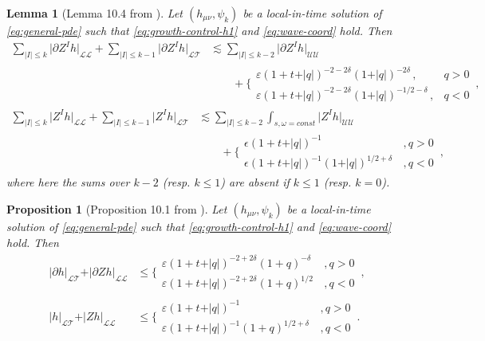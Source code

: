 \documentclass[11pt, a4paper]{amsart}
\numberwithin{equation}{section}
\newtheorem{lemma}[theorem]{Lemma}
\newtheorem{proposition}[theorem]{Proposition}
\numberwithin{theorem}{section}
\newcommand{\p}{\partial}
\newcommand{\mn}{{\mu \nu}}
\newcommand{\UU}{{\mathcal{U} \mathcal{U}}}
\newcommand{\LL}{{\mathcal{L} \mathcal{L}}}
\newcommand{\LT}{{\mathcal{L} \mathcal{T}}}
\newcommand{\qv}{\vert q \vert}
\newcommand{\I}{\vert I \vert}
\begin{document}
 \begin{lemma}[Lemma 10.4 from \cite{LR:04}] \label{lemma-10.4}
Let $(h_\mn, \psi_k)$ be a local-in-time solution of \eqref{eq:general-pde} such that \eqref{eq:growth-control-h1} and \eqref{eq:wave-coord} hold. Then
\begin{align*}
\sum_{\I \leq k} \vert \p Z^I h \vert_\LL + \sum_{\I \leq k-1} \vert \p Z^I h \vert_\LT & \lesssim \sum_{\I \leq k-2} \vert \p Z^I h \vert_\UU \\ & \qquad + \Bigg\lbrace \begin{array}{ll}
\varepsilon (1+t+\qv)^{-2-2 \delta} (1+\qv)^{-2 \delta} \,, & q>0 \\
\varepsilon (1+t+\qv)^{-2-2 \delta} (1+\qv)^{-1/2-\delta} \,, & q<0 
\end{array} \,,
\end{align*}
\begin{align*}
\sum_{\I \leq k} \vert Z^I h \vert_\LL + \sum_{\I \leq k-1} \vert Z^I h \vert_\LT & \lesssim \sum_{\I \leq k-2} \int_{s,\omega = const} \vert Z^I h \vert_\UU \\ & \qquad + \Bigg\lbrace \begin{array}{ll}
\epsilon (1+t+\qv)^{-1} & \,, q>0 \\
\epsilon (1+t+\qv)^{-1} (1+\qv)^{1/2+\delta} & \,, q<0 
\end{array}\,,
\end{align*}
where here the sums over $k-2$ (resp. $k\leq 1$) are absent if $k \leq 1$ (resp. $k=0$).
\end{lemma}

\begin{proposition}[Proposition 10.1 from \cite{LR:04}] \label{prop-10.1b}
Let $(h_\mn, \psi_k)$ be a local-in-time solution of \eqref{eq:general-pde} such that \eqref{eq:growth-control-h1} and \eqref{eq:wave-coord} hold. Then
\begin{align*}
\vert \p h \vert_{\mathcal{L} \mathcal{T}}  + \vert \p Z h \vert_\LL & \leq \Bigg\lbrace \begin{array}{ll}
\varepsilon (1+t+\qv)^{-2 + 2 \delta}(1+q)^{-\delta} & \,, q>0 \\
\varepsilon (1+t+\qv)^{-2 + 2 \delta}(1+q)^{1/2} & \,, q<0 
\end{array} \,, \\
\vert  h \vert_{\mathcal{L} \mathcal{T}}  + \vert Z h \vert_\LL & \leq \Bigg\lbrace \begin{array}{ll}
\varepsilon (1+t+\qv)^{-1} & \,, q>0 \\
\varepsilon (1+t+\qv)^{-1}(1+q)^{1/2+\delta} & \,, q<0 
\end{array} \,.
\end{align*}
\end{proposition}
\end{document}
